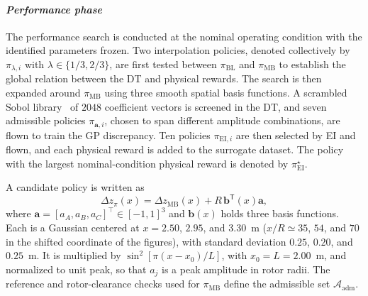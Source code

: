 \documentclass[journal]{IEEEtran}
\begin{document}
\paragraph*{\textit{Performance phase}}
\label{sec:performance-phase}
The performance search is conducted at the nominal operating condition with the identified parameters frozen. Two interpolation policies, denoted collectively by $\pi_{\lambda,i}$ with $\lambda\in\{1/3,2/3\}$, are first tested between $\pi_{\mathrm{BL}}$ and $\pi_{\mathrm{MB}}$ to establish the global relation between the DT and physical rewards. The search is then expanded around $\pi_{\mathrm{MB}}$ using three smooth spatial basis functions. A scrambled Sobol library~\cite{Owen1998} of $2048$ coefficient vectors is screened in the DT, and seven admissible policies $\pi_{\mathbf a,i}$, chosen to span different amplitude combinations, are flown to train the GP discrepancy. Ten policies $\pi_{\mathrm{EI},i}$ are then selected by EI and flown, and each physical reward is added to the surrogate dataset. The policy with the largest nominal-condition physical reward is denoted by $\pi_{\mathrm{EI}}^{\star}$.

A candidate policy is written as
\begin{equation}
 \Delta z_{\pi}(x)=\Delta z_{\mathrm{MB}}(x)+
 R\,\mathbf{b}^{\mathsf T}(x)\mathbf a,
 \label{eq:rt-policy}
\end{equation}
where $\mathbf a=[a_A,a_B,a_C]^\top\in[-1,1]^3$ and $\mathbf{b}(x)$ holds three basis functions. Each is a Gaussian centered at $x=2.50$, $2.95$, and $3.30$~m ($x/R\simeq35$, $54$, and $70$ in the shifted coordinate of the figures), with standard deviation $0.25$, $0.20$, and $0.25$~m. It is multiplied by $\sin^2[\pi(x-x_0)/L]$, with $x_0=L=2.00$~m, and normalized to unit peak, so that $a_j$ is a peak amplitude in rotor radii. The reference and rotor-clearance checks used for $\pi_{\mathrm{MB}}$ define the admissible set $\mathcal A_{\mathrm{adm}}$.
\end{document}
